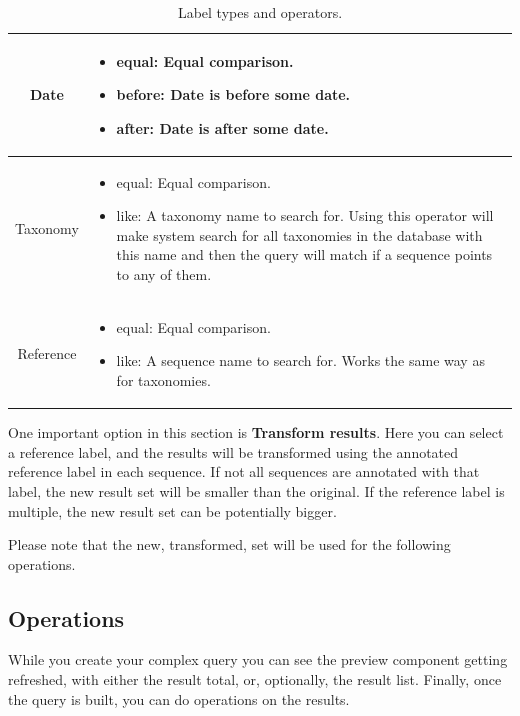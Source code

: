 \begin{table}[H]
{\begin{tabular}{ | c | p{} |}
      Date & \begin{itemize}
        \item equal: Equal comparison.
        \item before: Date is before some date.
        \item after: Date is after some date.
      \end{itemize} \\ \hline
      
      Taxonomy & \begin{itemize}
        \item equal: Equal comparison.
        \item like: A taxonomy name to search for. Using this operator will make system search for all
        taxonomies in the database with this name and then the query will match if a sequence points to any of them.
      \end{itemize} \\ \hline
      
      Reference & \begin{itemize}
        \item equal: Equal comparison.
        \item like: A sequence name to search for. Works the same way as for taxonomies.
      \end{itemize} \\ \hline
  \end{tabular}}
  \caption{Label types and operators.}
  \label{tbl:operators}
\end{table}

One important option in this section is \textbf{Transform results}. Here you can select a reference label,
and the results will be transformed using the annotated reference label in each sequence.
If not all sequences are annotated with that label, the new result set will be smaller than the original.
If the reference label is multiple, the new result set can be potentially bigger.

Please note that the new, transformed, set will be used for the following operations.

\subsection{Operations}

While you create your complex query you can see the preview component getting refreshed,
with either the result total, or, optionally, the result list. Finally, once the query is built,
you can do operations on the results.

